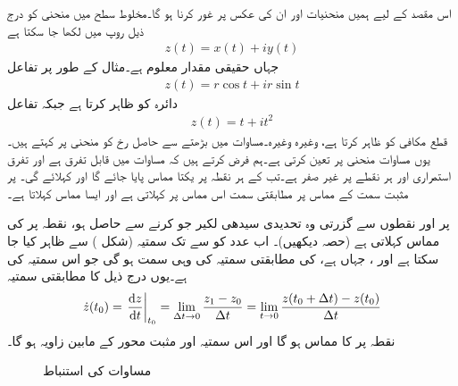 اس مقصد کے لیے ہمیں منحنیات اور ان کی عکس پر غور کرنا ہو گا۔مخلوط سطح  میں منحنی  کو درج ذیل روپ میں لکھا جا سکتا ہے
\begin{align}\label{مساوات_نقش_عمومی_منحنی_الف}
z(t)=x(t)+iy(t)
\end{align}
جہاں  حقیقی مقدار معلوم ہے۔مثال کے طور پر تفاعل
\begin{align*}
z(t)=r\cos t+ir\sin t
\end{align*}
دائرہ  کو ظاہر کرتا ہے جبکہ تفاعل
\begin{align*}
z(t)=t+it^2
\end{align*}
قطع مکافی  کو ظاہر کرتا ہے، وغیرہ وغیرہ۔مساوات  میں بڑھتے  سے حاصل رخ کو منحنی پر  کہتے ہیں۔یوں مساوات  منحنی  پر   تعین کرتی ہے۔ہم فرض کرتے ہیں کہ مساوات  میں  قابل تفرق ہے اور تفرق  استمراری اور ہر نقطے پر غیر صفر ہے۔تب  کے ہر نقطہ پر یکتا مماس پایا جائے گا اور   کہلائے گی۔  پر مثبت سمت  کے مماس پر مطابقتی سمت  اس مماس پر  کہلاتی ہے اور ایسا مماس  کہلاتا ہے۔ 

 پر  اور   نقطوں سے گزرتی وہ تحدیدی سیدھی لکیر جو  کرنے سے حاصل ہو، نقطہ  پر  کی مماس کہلاتی ہے (حصہ  دیکھیں)۔ اب عدد  کو  سے  تک سمتیہ (شکل ) سے ظاہر کیا جا سکتا ہے اور  ، جہاں  ہے، کی مطابقتی سمتیہ کی وہی سمت ہو گی جو اس سمتیہ کی ہے۔یوں  درج ذیل کا مطابقتی سمتیہ
\begin{align}\label{مساوات_نقش_عمومی_منحنی_ب}
\dot{z}(t_0)=\left. \frac{\dif z}{\dif t}\right|_{t_0}=\lim_{\Delta t\to 0}\frac{z_1-z_0}{\Delta t}=\lim_{t\to 0} \frac{z(t_0+\Delta t)-z(t_0)}{\Delta t}
\end{align}
نقطہ  پر  کا مماس ہو گا اور اس سمتیہ اور مثبت محور  کے مابین زاویہ  ہو گا۔
\begin{figure}
\centering
{}
\caption{مساوات  کی استنباط}
\label{شکل_نقش_استنباط}
\end{figure}

